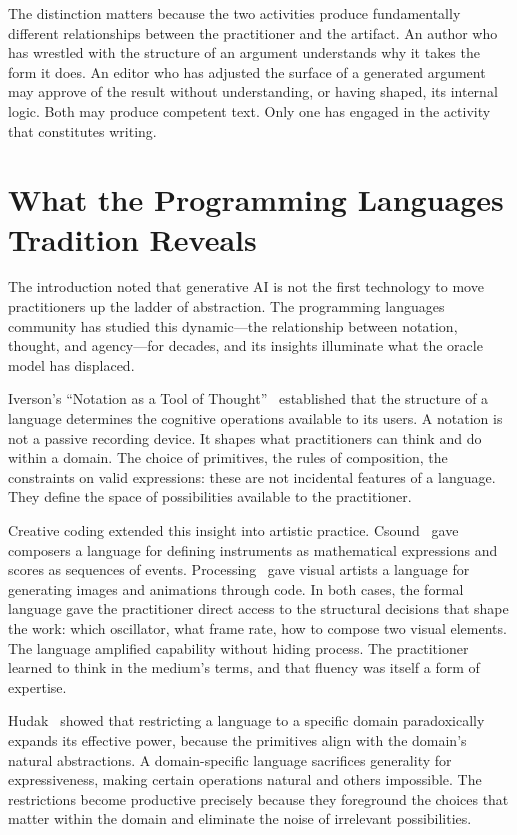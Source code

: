 \documentclass[11pt]{article}
\begin{document}
The distinction matters because the two activities produce fundamentally different relationships between the practitioner and the artifact. An author who has wrestled with the structure of an argument understands why it takes the form it does. An editor who has adjusted the surface of a generated argument may approve of the result without understanding, or having shaped, its internal logic. Both may produce competent text. Only one has engaged in the activity that constitutes writing.

\section{What the Programming Languages Tradition Reveals}

The introduction noted that generative AI is not the first technology to move practitioners up the ladder of abstraction. The programming languages community has studied this dynamic---the relationship between notation, thought, and agency---for decades, and its insights illuminate what the oracle model has displaced.

Iverson's ``Notation as a Tool of Thought''~\cite{iverson1980} established that the structure of a language determines the cognitive operations available to its users. A notation is not a passive recording device. It shapes what practitioners can think and do within a domain. The choice of primitives, the rules of composition, the constraints on valid expressions: these are not incidental features of a language. They define the space of possibilities available to the practitioner.

Creative coding extended this insight into artistic practice. Csound~\cite{vercoe1986} gave composers a language for defining instruments as mathematical expressions and scores as sequences of events. Processing~\cite{reas2007} gave visual artists a language for generating images and animations through code. In both cases, the formal language gave the practitioner direct access to the structural decisions that shape the work: which oscillator, what frame rate, how to compose two visual elements. The language amplified capability without hiding process. The practitioner learned to think in the medium's terms, and that fluency was itself a form of expertise.

Hudak~\cite{hudak1996} showed that restricting a language to a specific domain paradoxically expands its effective power, because the primitives align with the domain's natural abstractions. A domain-specific language sacrifices generality for expressiveness, making certain operations natural and others impossible. The restrictions become productive precisely because they foreground the choices that matter within the domain and eliminate the noise of irrelevant possibilities.
\end{document}
